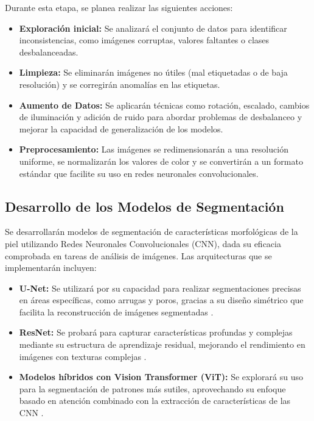 Durante esta etapa, se planea realizar las siguientes acciones:
\begin{itemize}
    \item \textbf{Exploración inicial:} Se analizará el conjunto de datos para identificar inconsistencias, como imágenes corruptas, valores faltantes o clases desbalanceadas.
    \item \textbf{Limpieza:} Se eliminarán imágenes no útiles (mal etiquetadas o de baja resolución) y se corregirán anomalías en las etiquetas.
    \item \textbf{Aumento de Datos:} Se aplicarán técnicas como rotación, escalado, cambios de iluminación y adición de ruido para abordar problemas de desbalanceo y mejorar la capacidad de generalización de los modelos.
    \item \textbf{Preprocesamiento:} Las imágenes se redimensionarán a una resolución uniforme, se normalizarán los valores de color y se convertirán a un formato estándar que facilite su uso en redes neuronales convolucionales.
\end{itemize}

\subsection{Desarrollo de los Modelos de Segmentación}
Se desarrollarán modelos de segmentación de características morfológicas de la piel utilizando Redes Neuronales Convolucionales (CNN), dada su eficacia comprobada en tareas de análisis de imágenes. Las arquitecturas que se implementarán incluyen:

\begin{itemize}
    \item \textbf{U-Net:} Se utilizará por su capacidad para realizar segmentaciones precisas en áreas específicas, como arrugas y poros, gracias a su diseño simétrico que facilita la reconstrucción de imágenes segmentadas \cite{ronneberger2015}.
    \item \textbf{ResNet:} Se probará para capturar características profundas y complejas mediante su estructura de aprendizaje residual, mejorando el rendimiento en imágenes con texturas complejas \cite{he2016}.
    \item \textbf{Modelos híbridos con Vision Transformer (ViT):} Se explorará su uso para la segmentación de patrones más sutiles, aprovechando su enfoque basado en atención combinado con la extracción de características de las CNN \cite{dosovitskiy2020}.
\end{itemize}

